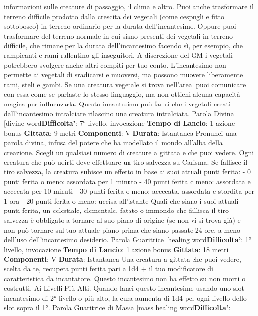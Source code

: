 \begin{multicols}{2}
informazioni sulle creature di passaggio, il clima e altro.
Puoi anche trasformare il terreno difficile prodotto dalla
crescita dei vegetali (come cespugli e fitto sottobosco)
in terreno ordinario per la durata dell’incantesimo.
Oppure puoi trasformare del terreno normale in cui
siano presenti dei vegetali in terreno difficile, che
rimane per la durata dell’incantesimo facendo sì, per
esempio, che rampicanti e rami rallentino gli inseguitori.
A discrezione del GM i vegetali potrebbero svolgere
anche altri compiti per tuo conto. L’incantesimo non
permette ai vegetali di sradicarsi e muoversi, ma
possono muovere liberamente rami, steli e gambi.
Se una creatura vegetale si trova nell’area, puoi
comunicare con essa come se parlaste lo stesso
linguaggio, ma non ottieni alcuna capacità magica per
influenzarla.
Questo incantesimo può far sì che i vegetali creati
dall’incantesimo intralciare rilascino una creatura
intralciata.
Parola Divina
[divine word\textbf{Difficolta'}:
7° livello, invocazione
\textbf{Tempo di Lancio}: 1 azione bonus
\textbf{Gittata}: 9 metri
\textbf{Componenti}: V
\textbf{Durata}: Istantanea
Pronunci una parola divina, infusa del potere che ha
modellato il mondo all’alba della creazione. Scegli un
qualsiasi numero di creature a gittata e che puoi
vedere. Ogni creatura che può udirti deve effettuare un
tiro salvezza su Carisma. Se fallisce il tiro salvezza, la
creatura subisce un effetto in base ai suoi attuali punti
ferita:
- 0 punti ferita o meno: assordata per 1 minuto
- 40 punti ferita o meno: assordata e accecata per 10
minuti
- 30 punti ferita o meno: accecata, assordata e
stordita per 1 ora
- 20 punti ferita o meno: uccisa all’istante
Quali che siano i suoi attuali punti ferita, un celestiale,
elementale, fatato o immondo che fallisca il tiro
salvezza è obbligato a tornare al suo piano di origine
(se non vi si trova già) e non può tornare sul tuo attuale
piano prima che siano passate 24 ore, a meno dell’uso
dell’incantesimo desiderio.
Parola Guaritrice
[healing word\textbf{Difficolta'}:
1° livello, invocazione
\textbf{Tempo di Lancio}: 1 azione bonus
\textbf{Gittata}: 18 metri
\textbf{Componenti}: V
\textbf{Durata}: Istantanea
Una creatura a gittata che puoi vedere, scelta da te,
recupera punti ferita pari a 1d4 + il tuo modificatore di
caratteristica da incantatore. Questo incantesimo non
ha effetto su non morti o costrutti.
Ai Livelli Più Alti. Quando lanci questo incantesimo
usando uno slot incantesimo di 2° livello o più alto, la
cura aumenta di 1d4 per ogni livello dello slot sopra il
1°.
Parola Guaritrice di Massa
[mass healing word\textbf{Difficolta'}:

\end{multicols}
